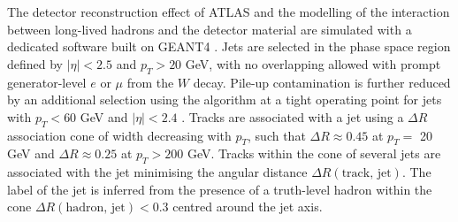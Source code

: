 The detector reconstruction effect of ATLAS and the modelling of the interaction between long-lived hadrons and the detector material are simulated with a dedicated software \cite{ATLASSimulationInfra} built on GEANT4 \cite{Agostinelli:602040}. Jets are selected in the phase space region defined by $|\eta| < 2.5$ and $p_T > 20$ GeV, with no overlapping allowed with prompt generator-level $e$ or $\mu$ from the $W$ decay. Pile-up contamination is further reduced by an additional selection using the  algorithm at a tight operating point for jets with $p_T < 60$ GeV and $|\eta| < 2.4$ \cite{ATLAS-CONF-2014-018}. Tracks are associated with a jet using a $\Delta R$ association cone of width decreasing with $p_T$, such that $\Delta R \approx 0.45$ at $p_T =$ 20 GeV and $\Delta R \approx 0.25$ at $p_T > 200$ GeV. Tracks within the cone of several jets are associated with the jet minimising the angular distance $\Delta R(\textrm{track, jet})$. The label of the jet is inferred from the presence of a truth-level hadron within the cone $\Delta R(\textrm{hadron, jet}) < 0.3$ centred around the jet axis.

